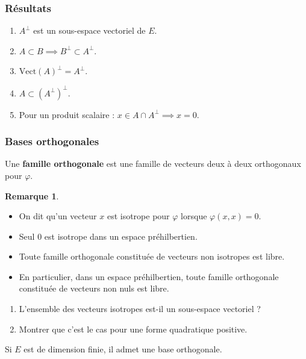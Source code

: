 \documentclass[french]{article}
\theoremstyle{plain}
\theoremstyle{definition}
\newtheorem*{rmq}{Remarque}
\theoremstyle{remark}
\begin{document}
\subsubsection*{Résultats}

\begin{enumerate}
	\item $A^\bot$ est un sous-espace vectoriel de $E$.
	\item $A\subset B\implies B^\bot\subset A^\bot$.
	\item $\text{Vect}(A)^\bot=A^\bot$.
	\item $A\subset (A^\bot)^\bot$.
	\item Pour un produit scalaire : $x\in A\cap A^\bot\implies x=0$.
\end{enumerate}

\subsubsection*{Bases orthogonales}

\begin{dfn}
	Une \textbf{famille orthogonale} est une famille de vecteurs deux à deux orthogonaux pour $\varphi$.
\end{dfn}

\begin{rmq}
	\begin{itemize}
		\item On dit qu'un vecteur $x$ est isotrope pour $\varphi$ lorsque $\varphi(x,x)=0$.
		\item Seul $0$ est isotrope dans un espace préhilbertien.
		\item Toute famille orthogonale constituée de vecteurs non isotropes est libre.
		\item En particulier, dans un espace préhilbertien, toute famille orthogonale constituée de vecteurs non nuls est libre.
	\end{itemize}
\end{rmq}

\begin{exo}
	\begin{enumerate}
		\item L'ensemble des vecteurs isotropes est-il un sous-espace vectoriel ?
		\item Montrer que c'est le cas pour une forme quadratique positive.
	\end{enumerate}
\end{exo}

\begin{thm}
	Si $E$ est de dimension finie, il admet une base orthogonale.
\end{thm}
\end{document}
